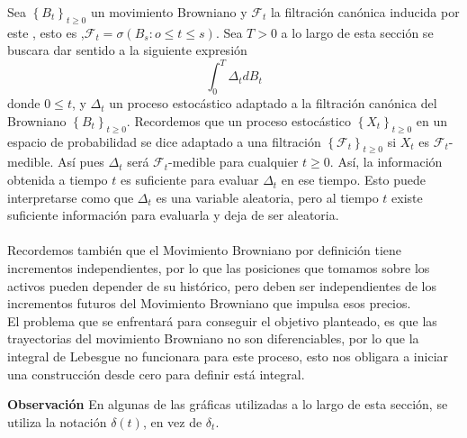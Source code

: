 \documentclass[11pt,notitlepage]{article}
\begin{document}
Sea \(\left \{ B_{t} \right \}_{t\geq 0}\) un movimiento Browniano y \(\mathcal{F}_t\) la filtración canónica inducida por este , esto es ,\(\mathcal{F}_t=\sigma (B_{s} : o\leq t\leq s)\).
Sea \(T>0\) a lo largo de esta sección se buscara dar sentido a la siguiente expresión
\[\int_{0}^{T}\Delta_{t}dB_t\]
donde \(0 \leq t\), y \(\Delta_{t}\) un proceso estocástico adaptado a la filtración canónica del Browniano \(\left \{ B_{t} \right \}_{t\geq 0}\). Recordemos que un proceso estocástico \(\left \{ X_{t} \right \}_{t\geq 0}\) en un espacio  de probabilidad se dice adaptado a una filtración \(\left\{\mathcal{F}_t\right\}_{t\geq 0}\) si \(X_{t}\) es \(\mathcal{F}_t\)-medible. Así pues \(\Delta_{t}\) será \(\mathcal{F}_t\)-medible para cualquier \(t \geq 0\).
Así, la información obtenida a tiempo $t$ es suficiente para evaluar \(\Delta_{t}\) en ese tiempo.
Esto puede interpretarse como que \(\Delta_{t}\) es una variable aleatoria, pero al tiempo \(t\) existe suficiente información para evaluarla y deja de ser aleatoria. \\ \\
Recordemos también que el Movimiento Browniano por definición tiene incrementos independientes, por lo que
las posiciones que tomamos sobre los activos pueden depender de su histórico, pero deben ser independientes de los incrementos futuros del Movimiento Browniano que impulsa esos precios. \\

El problema que se enfrentará para conseguir el objetivo planteado, es que las trayectorias del movimiento Browniano no son diferenciables, por lo que la integral de Lebesgue no funcionara para este proceso, esto nos obligara a iniciar una construcción desde cero para definir está integral. 

\textbf{Observación} En algunas de las gráficas utilizadas a lo largo de esta sección, se utiliza la notación \(\delta(t)\), en vez de \(\delta_t\).
\end{document}
